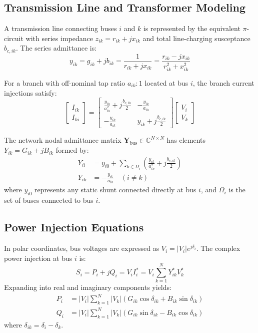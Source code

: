 ﻿\documentclass[conference,10pt]{IEEEtran}
\begin{document}
\subsection{Transmission Line and Transformer Modeling}
A transmission line connecting buses $i$ and $k$ is represented by the equivalent $\pi$-circuit with series impedance $z_{ik} = r_{ik} + j x_{ik}$ and total line-charging susceptance $b_{c,ik}$. The series admittance is:
\begin{equation}
y_{ik} = g_{ik} + j b_{ik} = \frac{1}{r_{ik} + j x_{ik}} = \frac{r_{ik} - j x_{ik}}{r_{ik}^2 + x_{ik}^2}
\end{equation}

For a branch with off-nominal tap ratio $a_{ik}:1$ located at bus $i$, the branch current injections satisfy:
\begin{equation}
\begin{bmatrix}
I_{ik} \\ I_{ki}
\end{bmatrix}
=
\begin{bmatrix}
\frac{y_{ik}}{a_{ik}^2} + j\frac{b_{c,ik}}{2} & -\frac{y_{ik}}{a_{ik}} \\
-\frac{y_{ik}}{a_{ik}} & y_{ik} + j\frac{b_{c,ik}}{2}
\end{bmatrix}
\begin{bmatrix}
V_i \\ V_k
\end{bmatrix}
\end{equation}

The network nodal admittance matrix $\mathbf{Y}_{\text{bus}} \in \mathbb{C}^{N \times N}$ has elements $Y_{ik} = G_{ik} + j B_{ik}$ formed by:
\begin{align}
Y_{ii} &= y_{i0} + \sum_{k \in \Omega_i} \left( \frac{y_{ik}}{a_{ik}^2} + j \frac{b_{c,ik}}{2} \right) \\
Y_{ik} &= -\frac{y_{ik}}{a_{ik}} \quad (i \neq k)
\end{align}
where $y_{i0}$ represents any static shunt connected directly at bus $i$, and $\Omega_i$ is the set of buses connected to bus $i$.

\subsection{Power Injection Equations}
In polar coordinates, bus voltages are expressed as $V_i = |V_i| e^{j \delta_i}$. The complex power injection at bus $i$ is:
\begin{equation}
S_i = P_i + j Q_i = V_i I_i^* = V_i \sum_{k=1}^N Y_{ik}^* V_k^*
\end{equation}
Expanding into real and imaginary components yields:
\begin{align}
P_i &= |V_i| \sum_{k=1}^N |V_k| \left( G_{ik} \cos\delta_{ik} + B_{ik} \sin\delta_{ik} \right) \label{eq:p_inj} \\
Q_i &= |V_i| \sum_{k=1}^N |V_k| \left( G_{ik} \sin\delta_{ik} - B_{ik} \cos\delta_{ik} \right) \label{eq:q_inj}
\end{align}
where $\delta_{ik} = \delta_i - \delta_k$.
\end{document}
